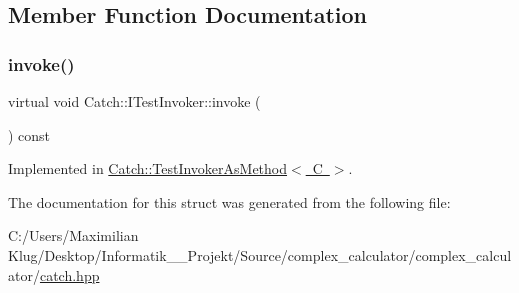 \subsection{Member Function Documentation}
\mbox{\label{struct_catch_1_1_i_test_invoker_a6fcd5c5b67d6d5ade6491ff33411ca7f}} 
\subsubsection{\texorpdfstring{invoke()}{invoke()}}
{\footnotesize\ttfamily virtual void Catch\+::\+I\+Test\+Invoker\+::invoke (\begin{DoxyParamCaption}{ }\end{DoxyParamCaption}) const\hspace{0.3cm}{\ttfamily [pure virtual]}}



Implemented in \mbox{\hyperlink{class_catch_1_1_test_invoker_as_method_a8115a06efe273f4112ec0b5452c1b5f2}{Catch\+::\+Test\+Invoker\+As\+Method$<$ C $>$}}.



The documentation for this struct was generated from the following file\+:\begin{DoxyCompactItemize}
\item 
C\+:/\+Users/\+Maximilian Klug/\+Desktop/\+Informatik\+\_\+\_\+\+Projekt/\+Source/complex\+\_\+calculator/complex\+\_\+calculator/\mbox{\hyperlink{catch_8hpp}{catch.\+hpp}}\end{DoxyCompactItemize}
